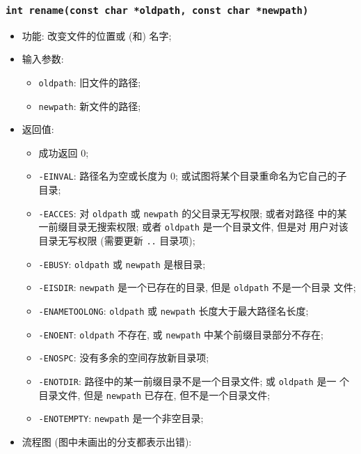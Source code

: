 \documentclass[nofonts, titlepage]{ctexart}
\begin{document}
  \subsubsection[\texttt{rename}]{\texttt{int rename(const char *oldpath, const char *newpath)}}
  \begin{itemize}
\item
  功能: 改变文件的位置或 (和) 名字;
\item
  输入参数:

  \begin{itemize}
  \item
    \texttt{oldpath}: 旧文件的路径;
  \item
    \texttt{newpath}: 新文件的路径;
  \end{itemize}
\item
  返回值:

  \begin{itemize}
  \item
    成功返回 0;
  \item
    \texttt{-EINVAL}: 路径名为空或长度为 0;
    或试图将某个目录重命名为它自己的子目录;
  \item
    \texttt{-EACCES}: 对 \texttt{oldpath} 或 \texttt{newpath}
    的父目录无写权限; 或者对路径 中的某一前缀目录无搜索权限; 或者
    \texttt{oldpath} 是一个目录文件, 但是对 用户对该目录无写权限
    (需要更新 \texttt{..} 目录项);
  \item
    \texttt{-EBUSY}: \texttt{oldpath} 或 \texttt{newpath} 是根目录;
  \item
    \texttt{-EISDIR}: \texttt{newpath} 是一个已存在的目录, 但是
    \texttt{oldpath} 不是一个目录 文件;
  \item
    \texttt{-ENAMETOOLONG}: \texttt{oldpath} 或 \texttt{newpath}
    长度大于最大路径名长度;
  \item
    \texttt{-ENOENT}: \texttt{oldpath} 不存在, 或 \texttt{newpath}
    中某个前缀目录部分不存在;
  \item
    \texttt{-ENOSPC}: 没有多余的空间存放新目录项;
  \item
    \texttt{-ENOTDIR}: 路径中的某一前缀目录不是一个目录文件; 或
    \texttt{oldpath} 是一 个目录文件, 但是 \texttt{newpath} 已存在,
    但不是一个目录文件;
  \item
    \texttt{-ENOTEMPTY}: \texttt{newpath} 是一个非空目录;
  \end{itemize}
\item
  流程图
  (图中未画出的分支都表示出错):


\end{itemize}
\end{document}

